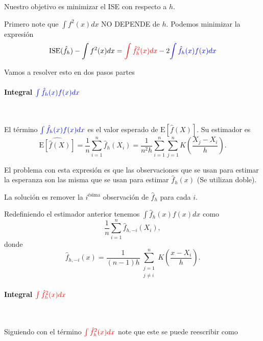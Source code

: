 \documentclass[12pt]{book}\usepackage[]{graphicx}\usepackage[]{color}
\theoremstyle{definition}
\theoremstyle{plain}
\begin{document}
Nuestro objetivo es minimizar el ISE con respecto a \(h\).

Primero note que \(\int f^{2}(x)dx\) NO DEPENDE de \(h\). Podemos minimizar la expresión
\begin{equation*}
	\mathrm{ISE}(\hat{f}_{h})-\int f^{2}(x)dx=
	\textcolor{red}{\int\hat{f}_{h}^{2}(x)dx}
	-2
	\textcolor{blue}{\int\hat{f}_{h}(x)f(x)dx}
\end{equation*}

Vamos a resolver esto en dos pasos partes

\newpage

\paragraph{ Integral \(\textcolor{blue}{\int\hat{f}_{h}(x)f(x)dx}\)}  \ \newline

El término \(\textcolor{blue}{\int\hat{f}_{h}(x)f(x)dx}\) es el valor esperado de
\(\mathrm{E}\left[\hat{f}(X)\right]\). Su estimador es
\begin{equation*}
	\widehat{\mathrm{E}\left[\hat{f}(X)\right]}
	= \frac{1}{n}\sum_{i=1}^{n}\hat{f}_{h}(X_{i})
	=\frac{1}{n^{2}h}\sum_{i=1}^{n}\sum_{j=1}^{n}
	K\left(\frac{X_{j}-X_{i}}{h}\right).
\end{equation*}

\begin{cuidado}{}{}
	El problema con esta expresión es que las observaciones que se usan para estimar la esperanza son las misma que se usan para estimar \(\hat{f}_{h}(x)\) (Se utilizan doble).
\end{cuidado}

La solución es remover la  $i^{\text{ésima}}$ observación de $\hat{f}_{h}$ para cada \(i\).

Redefiniendo el estimador anterior tenemos $\int \hat{f}_{h}(x)f(x)dx$ como
\[
	\frac{1}{n}\sum_{i=1}^{n}\hat{f}_{h,-i}(X_{i}),
\]
donde
\[
	\hat{f}_{h,-i}(x)=\frac{1}{(n-1)h}\sum_{\substack{j=1\\ j\neq i}}^{n}K\left( \frac{x-X_{i}}{h} \right) .
\]
\newpage

\paragraph{ Integral \(\textcolor{red}{\int\hat{f}_{h}^{2}(x)dx}\)}  \ \newline

Siguiendo con el término \(\textcolor{red}{\int\hat{f}_{h}^{2}(x)dx}\) note que este se puede reescribir como
\end{document}
